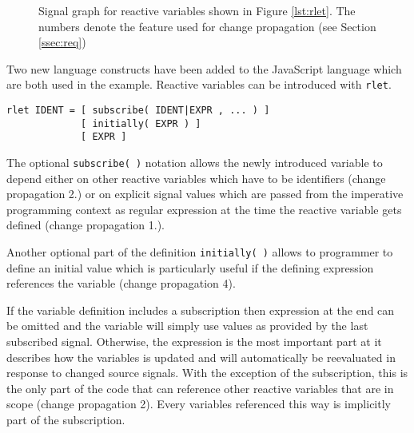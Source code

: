 \documentclass{sig-alternate-05-2015}
\begin{document}
\begin{figure}
\caption{Signal graph for reactive variables shown in Figure \ref{lst:rlet}.  The numbers denote the feature used for change propagation (see Section \ref{ssec:req})}
\label{fig:graph}
\end{figure}

Two new language constructs have been added to the JavaScript language which are both used in the example.  Reactive variables can be introduced with \lstinline+rlet+.

\begin{lstlisting}
rlet IDENT = [ subscribe( IDENT|EXPR , ... ) ]
             [ initially( EXPR ) ]
             [ EXPR ]\end{lstlisting}

The optional \lstinline+subscribe( )+ notation allows the newly introduced variable to depend either on other reactive variables which have to be identifiers (change propagation 2.) or on explicit signal values which are passed from the imperative programming context as regular expression at the time the reactive variable gets defined (change propagation 1.).

Another optional part of the definition \lstinline+initially( )+ allows to programmer to define an initial value which is particularly useful if the defining expression references the variable (change propagation 4).

If the variable definition includes a subscription then expression at the end can be omitted and the variable will simply use values as provided by the last subscribed signal.  Otherwise, the expression is the most important part at it describes how the variables is updated and will automatically be reevaluated in response to changed source signals.  With the exception of the subscription, this is the only part of the code that can reference other reactive variables that are in scope (change propagation 2).  Every variables referenced this way is implicitly part of the subscription.
\end{document}
